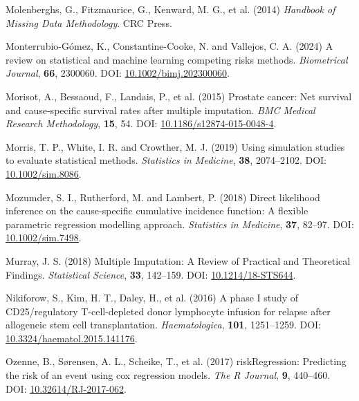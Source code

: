 \documentclass[
  letterpaper,
  DIV=11,
  numbers=noendperiod]{scrreprt}
\newlength{\cslhangindent}
\newenvironment{CSLReferences}[2] %
 {\begin{list}{}{%
  \setlength{\itemindent}{0pt}
  \setlength{\leftmargin}{0pt}
  \setlength{\parsep}{0pt}
  \ifodd #1
   \setlength{\leftmargin}{\cslhangindent}
   \setlength{\itemindent}{-1\cslhangindent}
  \fi
  \setlength{\itemsep}{#2\baselineskip}}}
 {\end{list}}
\begin{document}
\begin{CSLReferences}{1}{1}
Molenberghs, G., Fitzmaurice, G., Kenward, M. G., et al. (2014)
\emph{Handbook of {Missing Data Methodology}}. CRC Press.

Monterrubio-Gómez, K., Constantine-Cooke, N. and Vallejos, C. A. (2024)
A review on statistical and machine learning competing risks methods.
\emph{Biometrical Journal}, \textbf{66}, 2300060. DOI:
\href{https://doi.org/10.1002/bimj.202300060}{10.1002/bimj.202300060}.

Morisot, A., Bessaoud, F., Landais, P., et al. (2015) Prostate cancer:
Net survival and cause-specific survival rates after multiple
imputation. \emph{BMC Medical Research Methodology}, \textbf{15}, 54.
DOI:
\href{https://doi.org/10.1186/s12874-015-0048-4}{10.1186/s12874-015-0048-4}.

Morris, T. P., White, I. R. and Crowther, M. J. (2019) Using simulation
studies to evaluate statistical methods. \emph{Statistics in Medicine},
\textbf{38}, 2074--2102. DOI:
\href{https://doi.org/10.1002/sim.8086}{10.1002/sim.8086}.

Mozumder, S. I., Rutherford, M. and Lambert, P. (2018) Direct likelihood
inference on the cause-specific cumulative incidence function: {A}
flexible parametric regression modelling approach. \emph{Statistics in
Medicine}, \textbf{37}, 82--97. DOI:
\href{https://doi.org/10.1002/sim.7498}{10.1002/sim.7498}.

Murray, J. S. (2018) Multiple {Imputation}: {A Review} of {Practical}
and {Theoretical Findings}. \emph{Statistical Science}, \textbf{33},
142--159. DOI:
\href{https://doi.org/10.1214/18-STS644}{10.1214/18-STS644}.

Nikiforow, S., Kim, H. T., Daley, H., et al. (2016) A phase {I} study of
{CD25}/regulatory {T-cell-depleted} donor lymphocyte infusion for
relapse after allogeneic stem cell transplantation.
\emph{Haematologica}, \textbf{101}, 1251--1259. DOI:
\href{https://doi.org/10.3324/haematol.2015.141176}{10.3324/haematol.2015.141176}.

Ozenne, B., Sørensen, A. L., Scheike, T., et al. (2017)
{riskRegression}: {Predicting} the risk of an event using cox regression
models. \emph{The R Journal}, \textbf{9}, 440--460. DOI:
\href{https://doi.org/10.32614/RJ-2017-062}{10.32614/RJ-2017-062}.


\end{CSLReferences}
\end{document}
